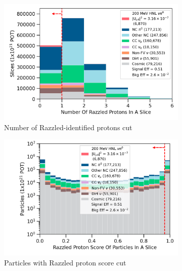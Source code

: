 \begin{figure}[ht!]
        \begin{subfigure}[b]{0.495\textwidth}   
            \centering 
            \includegraphics[width=\textwidth]{nrazzled_proton_precut}
            \caption{Number of Razzled-identified protons cut}%
            \label{fig:nrazzled_proton_full}
        \end{subfigure}
        \hfill
        \begin{subfigure}[b]{0.495\textwidth}   
            \centering 
            \includegraphics[width=\textwidth]{razzled_proton_score_precut}
            \caption{Particles with Razzled proton score cut}%
            \label{fig:razzled_proton_score_full}
        \end{subfigure}
        \hfill
        \begin{subfigure}[b]{0.495\textwidth}   
            \centering 

\end{subfigure}
\end{figure}
